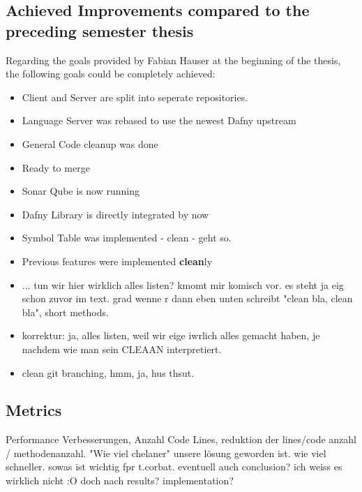 \subsection{Achieved Improvements compared to the preceding semester thesis}
Regarding the goals provided by Fabian Hauser at the beginning of the thesis, the following goals could be completely achieved:
\begin{itemize}
    \item Client and Server are split into seperate repositories.
    \item Language Server was rebased to use the newest Dafny upstream
    \item General Code cleanup was done
    \item Ready to merge
    \item Sonar Qube is now running
    \item Dafny Library is directly integrated by now
    \item Symbol Table was implemented - clean - geht so.
    \item Previous features were implemented \textbf{clean}ly
    \item ... tun wir hier wirklich alles listen? kmomt mir komisch vor. es steht ja eig schon zuvor im text. grad wenne r dann eben unten schreibt "clean bla, clean bla", short methods.
    \item korrektur: ja, alles listen, weil wir eige iwrlich alles gemacht haben, je nachdem wie man sein CLEAAN interpretiert.
    \item clean git branching, hmm, ja, hus thsut.
\end{itemize}





\subsection{Metrics}

Performance Verbesserungen, Anzahl Code Lines, reduktion der lines/code anzahl / methodenanzahl.
"Wie viel chelaner" unsere lösung geworden ist. wie viel schneller. sowas ist wichtig fpr t.corbat. 
eventuell auch conclusion? ich weiss es wirklich nicht :O doch nach results? implementation?